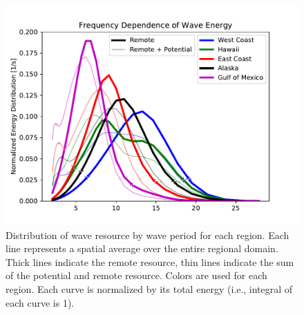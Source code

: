 \begin{figure}[ht]
  \centering
  \includegraphics[width=\linewidth]{../fig/TotalResource_Freq02.pdf}
  \caption[Distribution of wave energy vs. wave-period.]{Distribution of wave resource by wave period for each region. Each line represents a spatial average over the entire regional domain. Thick lines indicate the remote resource, thin lines indicate the sum of the potential and remote resource. Colors are used for each region. Each curve is normalized by its total energy (i.e., integral of each curve is 1).}
  \label{fig:remote-freq}
\end{figure}

